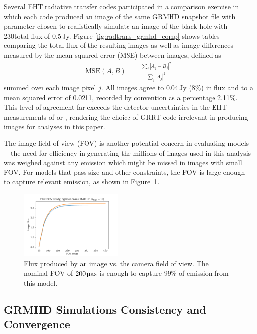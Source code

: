 Several EHT radiative transfer codes participated in a comparison exercise in which each code produced an image of the same GRMHD snapshot file  with parameter chosen to realistically simulate an image of the black hole  with 230\GHz total flux of 0.5\,Jy.
Figure \ref{fig:radtrans_grmhd_comp} shows tables comparing the total flux of the resulting images as well as image differences measured by the mean squared error (MSE) between images, defined as
\begin{align}
    \mathrm{MSE}(A, B) &= \frac{\sum_j|A_j-B_j|^2}{\sum_j|A_j|^2}
\end{align}
summed over each image pixel $j$.
All images agree to 0.04\,Jy (8\%) in flux and to a mean squared error of 0.0211, recorded by convention as a percentage 2.11\%.
This level of agreement far exceeds the detector uncertainties in the EHT measurements of \sgra or , rendering the choice of GRRT code irrelevant in producing images for analyses in this paper.

The image field of view (FOV) is another potential concern in evaluating models---the need for efficiency in generating the millions of images used in this analysis was weighed against any emission which might be missed in images with small FOV.
For models that pass size and other constraints, the FOV is large enough to capture relevant emission, as shown in Figure~\ref{fig:radtrans_fov_study}.

\begin{figure}
  \centering
  \includegraphics[width=0.45\textwidth]{figures/fov_study.pdf}
  \caption{Flux produced by an image vs. the camera field of view.
The nominal FOV of $200\uas$ is enough to capture 99\% of emission from this model.}
  \label{fig:radtrans_fov_study}
\end{figure}

\subsection{GRMHD Simulations Consistency and Convergence}\label{app:resolution_study}

